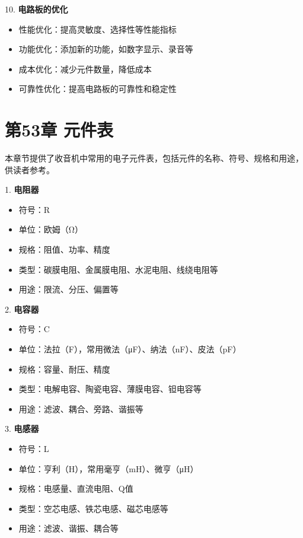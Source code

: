 \documentclass[12pt,UTF8]{ctexbook}
\begin{document}
10. \textbf{电路板的优化}
    \begin{itemize}[leftmargin=3.5em]
    \item 性能优化：提高灵敏度、选择性等性能指标
    \item 功能优化：添加新的功能，如数字显示、录音等
    \item 成本优化：减少元件数量，降低成本
    \item 可靠性优化：提高电路板的可靠性和稳定性
    \end{itemize}
\chapter*{第53章 元件表}

本章节提供了收音机中常用的电子元件表，包括元件的名称、符号、规格和用途，供读者参考。

1. \textbf{电阻器}
   \begin{itemize}[leftmargin=3.5em]
   \item 符号：R
   \item 单位：欧姆（Ω）
   \item 规格：阻值、功率、精度
   \item 类型：碳膜电阻、金属膜电阻、水泥电阻、线绕电阻等
   \item 用途：限流、分压、偏置等
   \end{itemize}

2. \textbf{电容器}
   \begin{itemize}[leftmargin=3.5em]
   \item 符号：C
   \item 单位：法拉（F），常用微法（μF）、纳法（nF）、皮法（pF）
   \item 规格：容量、耐压、精度
   \item 类型：电解电容、陶瓷电容、薄膜电容、钽电容等
   \item 用途：滤波、耦合、旁路、谐振等
   \end{itemize}

3. \textbf{电感器}
   \begin{itemize}[leftmargin=3.5em]
   \item 符号：L
   \item 单位：亨利（H），常用毫亨（mH）、微亨（μH）
   \item 规格：电感量、直流电阻、Q值
   \item 类型：空芯电感、铁芯电感、磁芯电感等
   \item 用途：滤波、谐振、耦合等
   \end{itemize}
\end{document}
